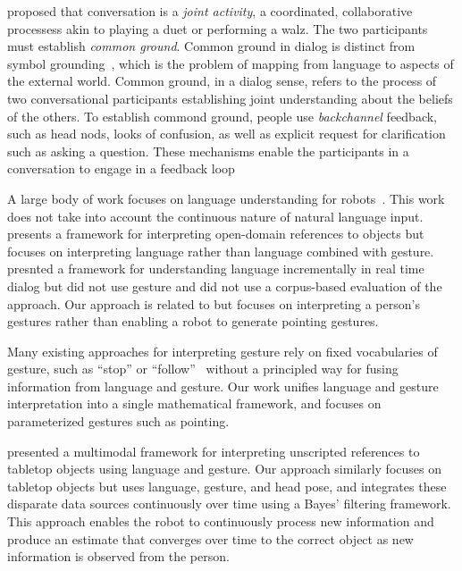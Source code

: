 \documentclass[letterpaper, 10 pt, conference]{ieeeconf}
\begin{document}
\citet{clark96} proposed that conversation is a {\em joint activity},
a coordinated, collaborative processess akin to playing a duet or
performing a walz.  The two participants must establish {\em common
  ground}.  Common ground in dialog is distinct from symbol
grounding~\citep{harnad90}, which is the problem of mapping from
language to aspects of the external world.  Common ground, in a dialog
sense, refers to the process of two conversational participants
establishing joint understanding about the beliefs of the others.  To
establish commond ground, people use {\em backchannel} feedback, such
as head nods, looks of confusion, as well as explicit request for
clarification such as asking a question.  These mechanisms enable the
participants in a conversation to engage in a feedback loop

A large body of work focuses on language understanding for
robots~\citep{macmahon06, dzifcak09, kollar10, matuszek12}.  This work
does not take into account the continuous nature of natural language
input.  \citet{guadarrama14} presents a framework for interpreting
open-domain references to objects but focuses on interpreting language
rather than language combined with gesture.  \citet{cantrell10}
presnted a framework for understanding language incrementally in real
time dialog but did not use gesture and did not use a corpus-based
evaluation of the approach.  Our approach is related to
\citet{holladay14} but focuses on interpreting a person's gestures
rather than enabling a robot to generate pointing gestures.

Many existing approaches for interpreting gesture rely on fixed
vocabularies of gesture, such as ``stop'' or
``follow''~\citep{waldherr00, marge11} without a principled way for
fusing information from language and gesture.  Our work unifies
language and gesture interpretation into a single mathematical
framework, and focuses on parameterized gestures such as pointing.




\citet{matuszek14} presented a multimodal framework for interpreting
unscripted references to tabletop objects using language and gesture.
Our approach similarly focuses on tabletop objects but uses language,
gesture, and head pose, and integrates these disparate data sources
continuously over time using a Bayes' filtering framework.  This
approach enables the robot to continuously process new information and
produce an estimate that converges over time to the correct object as
new information is observed from the person.  
\end{document}

